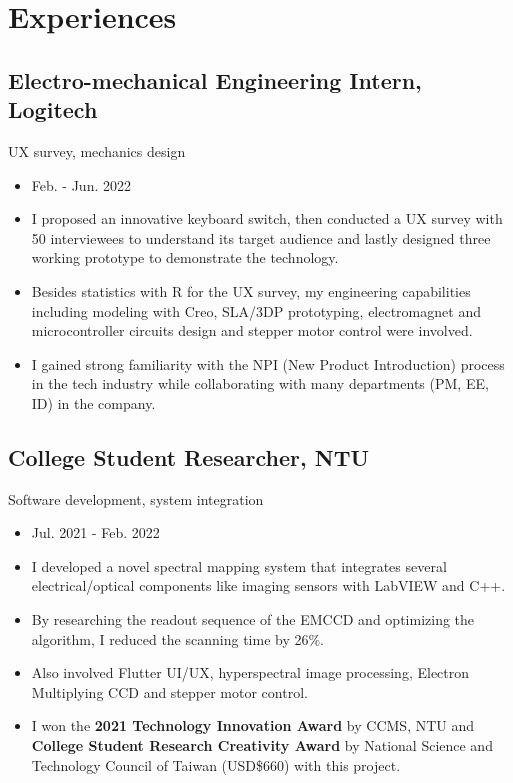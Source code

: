 \documentclass[12pt]{article}
\begin{document}
    \section*{Experiences
    }
        \subsection*{Electro-mechanical Engineering Intern, Logitech}
        {\sffamily
        UX survey, mechanics design
        \begin{itemize}
            \item Feb. - Jun. 2022
            \item I proposed an innovative keyboard switch, then conducted a UX survey with 50 interviewees to understand its target audience and lastly designed three working prototype to demonstrate the technology.
            \item Besides statistics with R for the UX survey, my engineering capabilities including modeling with Creo, SLA/3DP prototyping, electromagnet and microcontroller circuits design and stepper motor control were involved.
            \item I gained strong familiarity with the NPI (New Product Introduction) process in the tech industry while collaborating with many departments (PM, EE, ID) in the company.
        \end{itemize}
        }
        \subsection*{College Student Researcher, NTU}
        {\sffamily
        Software development, system integration
        \begin{itemize}
            \item Jul. 2021 - Feb. 2022
            \item I developed a novel spectral mapping system that integrates several electrical/optical components like imaging sensors with LabVIEW and C++. %
            \item By researching the readout sequence of the EMCCD and optimizing the algorithm, I reduced the scanning time by 26\%.
            \item Also involved Flutter UI/UX, hyperspectral image processing, Electron Multiplying CCD and stepper motor control.
            \item I won the \textbf{2021 Technology Innovation Award} by CCMS, NTU and \textbf{College Student Research Creativity Award} by National Science and Technology Council of Taiwan (USD\$660) with this project.
        \end{itemize}}
\end{document}
